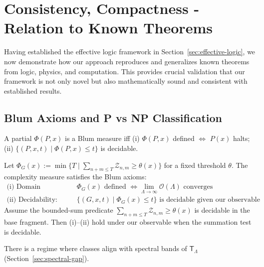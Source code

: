 \section{Consistency, Compactness - Relation to Known Theorems}
\label{sec:consistency}

Having established the effective logic framework in Section~\ref{sec:effective-logic}, we now demonstrate how our approach reproduces and generalizes known theorems from logic, physics, and computation. This provides crucial validation that our framework is not only novel but also mathematically sound and consistent with established results.

\subsection{Blum Axioms and P vs NP Classification}

\begin{definition}
A partial $\Phi(P,x)$ is a Blum measure iff
(i) $\Phi(P,x)$ defined $\Leftrightarrow$ $P(x)$ halts;
(ii) $\{(P,x,t)\mid \Phi(P,x)\le t\}$ is decidable.
\end{definition}

\begin{proposition}
Let $\Phi_G(x):=\min\{T\mid \sum_{n+m\le T}\mathcal{Z}_{n,m}\ge \theta(x)\}$ for a fixed threshold $\theta$.
The complexity measure satisfies the Blum axioms:
\begin{align}
\text{(i) Domain condition: } &\Phi_G(x) \text{ defined } \Leftrightarrow \lim_{\Lambda \to \infty} \mathcal{O}(\Lambda) \text{ converges} \\
\text{(ii) Decidability: } &\{(G,x,t) \mid \Phi_G(x) \leq t\} \text{ is decidable given our observable}
\end{align}
Assume the bounded-sum predicate $\sum_{n+m\le T}\mathcal{Z}_{n,m}\ge\theta(x)$ is decidable in the base fragment. Then (i)–(ii) hold under our observable when the summation test is decidable.
\end{proposition}

\begin{conjecture}
There is a regime where classes align with spectral bands of $\mathsf{T}_\Lambda$ (Section~\ref{sec:spectral-gap}).
\end{conjecture}

